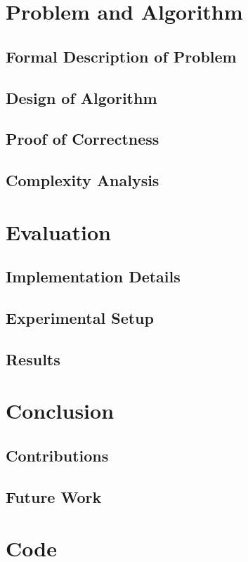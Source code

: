 \documentclass[fyp]{socreport}
\begin{document}
\chapter{Problem and Algorithm}
\section{Formal Description of Problem}
\section{Design of Algorithm}
\section{Proof of Correctness}
\section{Complexity Analysis}

\chapter{Evaluation}
\section{Implementation Details}
\section{Experimental Setup}
\section{Results}

\chapter{Conclusion}
\section{Contributions}
\section{Future Work}




\appendix
\chapter{Code}
\end{document}
